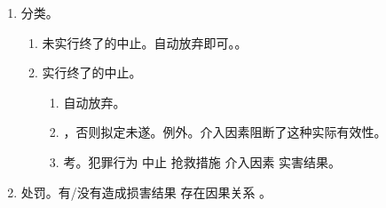 \begin{enumerate}
\begin{enumerate}
\begin{enumerate}
\begin{enumerate}
\begin{itemize}
                                \end{itemize}
                          \item 受骗产生认识错误。
                                \begin{itemize}
                                  \item {}。
                                  \item {}。
                                \end{itemize}
                        \end{enumerate}
                \end{enumerate}
          \item 有效性。
                \begin{enumerate}
                  \item 防止措施。可能、实际的有效性 \yjt 没有 \yjt （特殊的）未遂（拟定）。没考过。
                  \item 特殊的中止。结合因果关系，介入因素考。
                \end{enumerate}
        \end{enumerate}
  \item 分类。
        \begin{enumerate}
          \item 未实行终了的中止。自动放弃即可。。
          \item 实行终了的中止。
                \begin{enumerate}
                  \item 自动放弃。
                  \item {}，否则拟定未遂。例外。介入因素阻断了这种实际有效性。
                  \item 考。犯罪行为 \yjt 中止 \yjt 抢救措施 \yjt 介入因素 \yjt 实害结果。
                \end{enumerate}
        \end{enumerate}
  \item 处罚。有/没有造成损害结果 \yjt 存在因果关系 \yjt {}。
\end{enumerate}
